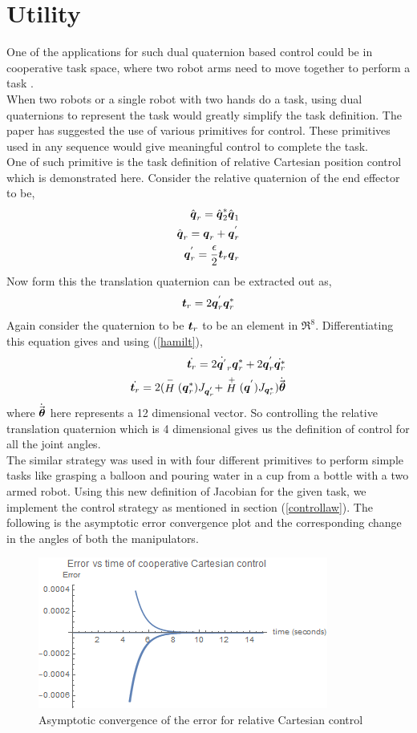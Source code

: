 \documentclass[a4paper,12pt]{article}
\newcommand{\Hp}{\ensuremath{\stackrel{+}{H}}\xspace}
\newcommand{\Hn}{\ensuremath{\stackrel{-}{H}}\xspace}
\begin{document}
\section{Utility}
One of the applications for such dual quaternion based control could be in cooperative task space, where two robot arms need to move together to perform a task \cite{adorno2010dual}.\\
When two robots or a single robot with two hands do a task, using dual quaternions to represent the task would greatly simplify the task definition. The paper has suggested the use of various primitives for control. These primitives used in any sequence would give meaningful control to complete the task.\\
One of such primitive is the task definition of relative Cartesian position control which is demonstrated here. Consider the relative quaternion of the end effector to be,
\begin{align}
	\hat{\boldsymbol{q}}_r = \hat{\boldsymbol{q}}^{*}_{2}\hat{\boldsymbol{q}}_{1}\\
	\hat{\boldsymbol{q}}_r = \boldsymbol{q}_r + \boldsymbol{q}^{'}_r\\
	\boldsymbol{q}^{'}_r = \frac{\epsilon}{2}\boldsymbol{t}_r \boldsymbol{q}_r
\end{align}
Now form this the translation quaternion can be extracted out as, 
\begin{align}
	\boldsymbol{t}_r = 2\boldsymbol{q}^{'}_r\boldsymbol{q}^{*}_r
\end{align}
Again consider the quaternion to be $\boldsymbol{t}_r$ to be an element in $\Re^{8}$. Differentiating this equation gives and using (\ref{hamilt}),
\begin{align}
	\dot{\bt_r} = 2\dot{\bq^{'}}_r\bq^{*}_r+2\bq^{'}_r\dot{\bq^{*}_r}\\
	\dot{\bt_r} = 2(\Hn(\bq^{*}_r)J_{\bq^{'}_r}+\Hp(\bq^{'})J_{\bq^{*}_r})\dot{\vec{\bth}}
\end{align}
where $\dot{\vec{\boldsymbol{\theta}}}$ here represents a 12 dimensional vector. So controlling the relative translation quaternion which is 4 dimensional gives us the definition of control for all the joint angles. \\
The similar strategy was used in \cite{adorno2010dual} with four different primitives to perform simple tasks like grasping a balloon and pouring water in a cup from a bottle with a two armed robot.
Using this new definition of Jacobian for the given task, we implement the control strategy as mentioned in section (\ref{controllaw}).
The following is the asymptotic error convergence plot and the corresponding change in the angles of both the manipulators.
\begin{figure}[H]
	\centering
	\includegraphics[scale=0.8]{dqc_ctc_error}
	\caption{Asymptotic convergence of the error for relative Cartesian control}
\end{figure}
\end{document}
